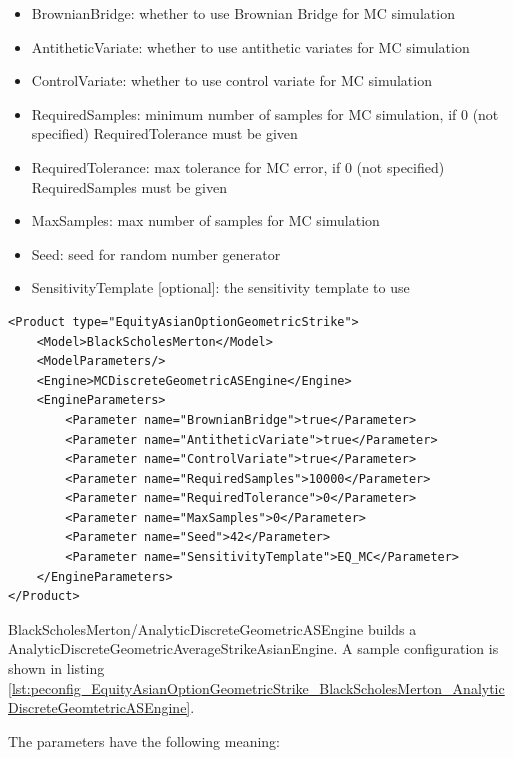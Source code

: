 \begin{itemize}
\item BrownianBridge: whether to use Brownian Bridge for MC simulation
\item AntitheticVariate: whether to use antithetic variates for MC simulation
\item ControlVariate: whether to use control variate for MC simulation
\item RequiredSamples: minimum number of samples for MC simulation, if 0 (not specified) RequiredTolerance must be given
\item RequiredTolerance: max tolerance for MC error, if 0 (not specified) RequiredSamples must be given
\item MaxSamples: max number of samples for MC simulation
\item Seed: seed for random number generator
\item SensitivityTemplate [optional]: the sensitivity template to use
\end{itemize}

\begin{longlisting}
\begin{verbatim}
<Product type="EquityAsianOptionGeometricStrike">
    <Model>BlackScholesMerton</Model>
    <ModelParameters/>
    <Engine>MCDiscreteGeometricASEngine</Engine>
    <EngineParameters>
        <Parameter name="BrownianBridge">true</Parameter>
        <Parameter name="AntitheticVariate">true</Parameter>
        <Parameter name="ControlVariate">true</Parameter>
        <Parameter name="RequiredSamples">10000</Parameter>
        <Parameter name="RequiredTolerance">0</Parameter>
        <Parameter name="MaxSamples">0</Parameter>
        <Parameter name="Seed">42</Parameter>
        <Parameter name="SensitivityTemplate">EQ_MC</Parameter>
    </EngineParameters>
</Product>
\end{verbatim}
\caption{Configuration for Product EquityAsianOptionGeometricStrike, Model BlackScholesMerton, Engine MCDiscreteGeometricASEngine}
\label{lst:peconfig_EquityAsianOptionGeometricStrike_BlackScholesMerton_MCDiscreteGeomtetricASEngine}
\end{longlisting}

BlackScholesMerton/AnalyticDiscreteGeometricASEngine builds a AnalyticDiscreteGeometricAverageStrikeAsianEngine. A sample
configuration is shown in listing
\ref{lst:peconfig_EquityAsianOptionGeometricStrike_BlackScholesMerton_AnalyticDiscreteGeomtetricASEngine}.

The parameters have the following meaning:


